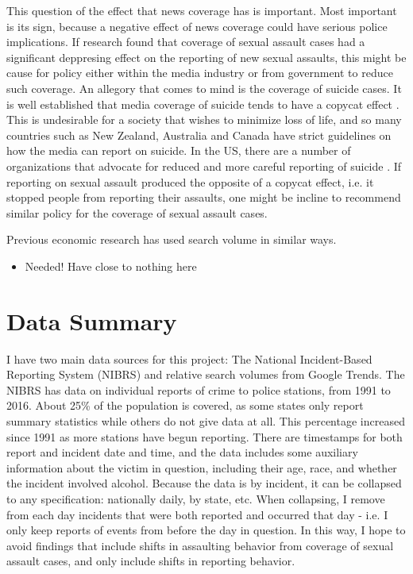 \documentclass[AER,draftmode]{AEA}
\begin{document}
This question of the effect that news coverage has is important. Most important is its sign, because a negative effect of news coverage could have serious police implications. If research found that coverage of sexual assault cases had a significant deppresing effect on the reporting of new sexual assaults, this might be cause for policy either within the media industry or from government to reduce such coverage. An allegory that comes to mind is the coverage of suicide cases. It is well established that media coverage of suicide tends to have a copycat effect \cite{stack_media_2003}. This is undesirable for a society that wishes to minimize loss of life, and so many countries such as New Zealand, Australia and Canada have strict guidelines on how the media can report on suicide. In the US, there are a number of organizations that advocate for reduced and more careful reporting of suicide \cite{noauthor_reportingonsuicide.org_2019}. If reporting on sexual assault produced the opposite of a copycat effect, i.e. it stopped people from reporting their assaults, one might be incline to recommend similar policy for the coverage of sexual assault cases. 

Previous economic research has used search volume in similar ways.
\begin{itemize}
    \item Needed! Have close to nothing here
\end{itemize}

\section{Data Summary}

I have two main data sources for this project: The National Incident-Based Reporting System (NIBRS) and relative search volumes from Google Trends. The NIBRS has data on individual reports of crime to police stations, from 1991 to 2016. About 25\% of the population is covered, as some states only report summary statistics while others do not give data at all. This percentage increased since 1991 as more stations have begun reporting. There are timestamps for both report and incident date and time, and the data includes some auxiliary information about the victim in question, including their age, race, and whether the incident involved alcohol. Because the data is by incident, it can be collapsed to any specification: nationally daily, by state, etc. When collapsing, I remove from each day incidents that were both reported and occurred that day - i.e. I only keep reports of events from before the day in question. In this way, I hope to avoid findings that include shifts in assaulting behavior from coverage of sexual assault cases, and only include shifts in reporting behavior. 
\end{document}
